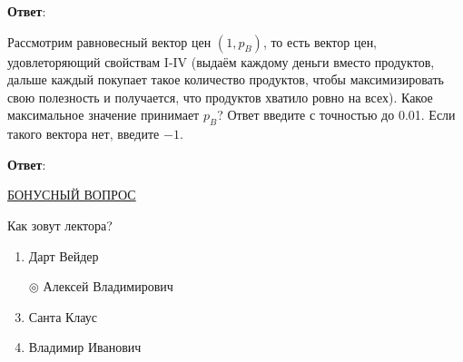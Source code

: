 \textbf{Ответ}: 

\task
Рассмотрим равновесный вектор цен $(1,p_B)$, то есть вектор цен, удовлеторяющий свойствам I-IV (выдаём каждому деньги вместо продуктов, дальше каждый покупает такое количество продуктов, чтобы максимизировать свою полезность и получается, что продуктов хватило ровно на всех). Какое максимальное значение принимает $p_B$? Ответ введите с точностью до 0.01. Если такого вектора нет, введите $-1$.

\textbf{Ответ}: 

\task
\underline{БОНУСНЫЙ ВОПРОС}

Как зовут лектора?

\begin{enumerate}[label=$\circ$]
	\item Дарт Вейдер
	\item[$\circledcirc$] Алексей Владимирович
	\item Санта Клаус
	\item Владимир Иванович
\end{enumerate}